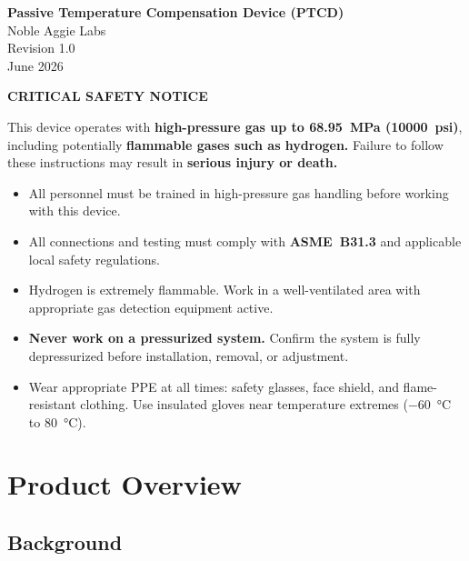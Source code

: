 \documentclass[12pt, letterpaper]{report}%
\newcounter{mycounter}           %
\newcounter{sub}[mycounter]      %
\begin{document}
\begin{appendices}
	\begin{center}
		{\Large \textbf{Passive Temperature Compensation Device (PTCD)}} \\[4pt]
		Noble Aggie Labs \\
		Revision 1.0 \\
		June 2026
	\end{center}

	\bigskip

	\begin{warningbox}
	\textbf{\large \textcolor{warnred}{CRITICAL SAFETY NOTICE}}

	\medskip
	This device operates with \textbf{high-pressure gas up to \SI{68.95}{\mega\pascal} (\num{10000}~psi)},
	including potentially \textbf{flammable gases such as hydrogen.}
	Failure to follow these instructions may result in \textbf{serious injury or death.}

	\medskip
	\begin{itemize}[leftmargin=1.5em, itemsep=2pt]
		\item All personnel must be trained in high-pressure gas handling before working with this device.
		\item All connections and testing must comply with \textbf{ASME~B31.3} and applicable local safety regulations.
		\item Hydrogen is extremely flammable. Work in a well-ventilated area with appropriate gas detection equipment active.
		\item \textbf{Never work on a pressurized system.} Confirm the system is fully depressurized before installation, removal, or adjustment.
		\item Wear appropriate PPE at all times: safety glasses, face shield, and flame-resistant clothing. Use insulated gloves near temperature extremes (\SI{-60}{\degreeCelsius} to \SI{+80}{\degreeCelsius}).
	\end{itemize}
	\end{warningbox}

	\bigskip

	\section{Product Overview}

	\subsection{Background}


\end{appendices}
\end{document}
